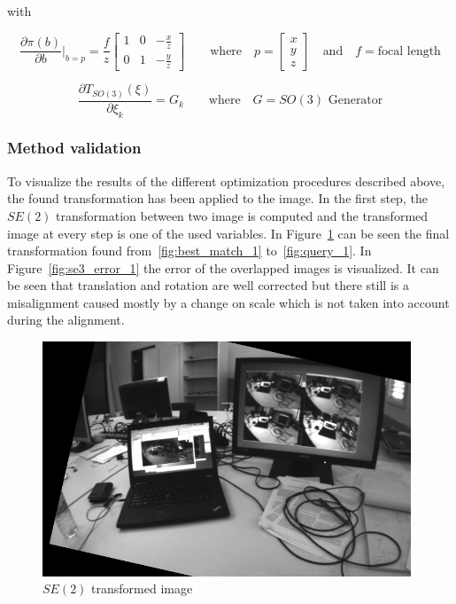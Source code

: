 with

\begin{equation}
  \frac{\partial \pi(b)}{\partial b} |_{b=p} = \frac{f}{z}
  \begin{bmatrix}
    1 & 0 & -\frac{x}{z} \\
    0 & 1 & -\frac{y}{z}
  \end{bmatrix}
  \qquad \text{where} \quad 
  p = \begin{bmatrix} x \\ y \\ z \end{bmatrix} \quad \text{and} \quad f = \text{focal length}
\end{equation}

\begin{equation}
  \frac{\partial T_{SO(3)}(\xi)}{\partial \xi_k}  = G_k \qquad \text{where} \quad G = \text{$SO(3)$ Generator}
\end{equation}


\subsubsection{Method validation}
\label{ssub:esm_method_validation}

To visualize the results of the different optimization procedures described above, the found transformation has been applied to the image. In the first step, the $SE(2)$ transformation between two image is computed and the transformed image at every step is one of the used variables. In Figure~\ref{fig:se2_transformation_1} can be seen the final transformation found from~\ref{fig:best_match_1} to~\ref{fig:query_1}. In Figure~\ref{fig:se3_error_1} the error of the overlapped images is visualized. It can be seen that translation and rotation are well corrected but there still is a misalignment caused mostly by a change on scale which is not taken into account during the alignment.\\

\begin{figure}[htpb]
  \centering
  \includegraphics[width=11cm]{img/se2_transformation_1.png}
  \caption{$SE(2)$ transformed image}
  \label{fig:se2_transformation_1}
\end{figure}

